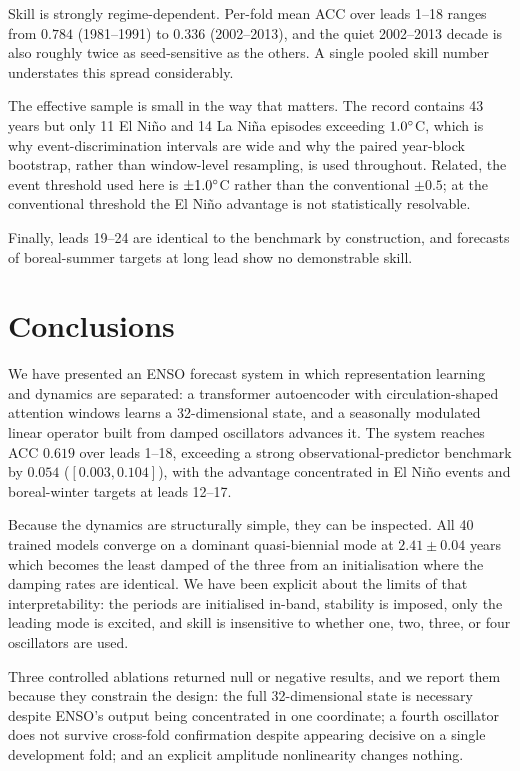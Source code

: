 Skill is strongly regime-dependent. Per-fold mean ACC over leads 1--18 ranges from $0.784$
(1981--1991) to $0.336$ (2002--2013), and the quiet 2002--2013 decade is also roughly twice as
seed-sensitive as the others. A single pooled skill number understates this spread
considerably.

The effective sample is small in the way that matters. The record contains 43 years but only 11
El Ni\~no and 14 La Ni\~na episodes exceeding $1.0^{\circ}$C, which is why event-discrimination
intervals are wide and why the paired year-block bootstrap, rather than window-level
resampling, is used throughout. Related, the event threshold used here is $\pm1.0^{\circ}$C rather
than the conventional $\pm0.5$; at the conventional threshold the El Ni\~no advantage is not
statistically resolvable.

Finally, leads 19--24 are identical to the benchmark by construction, and forecasts of
boreal-summer targets at long lead show no demonstrable skill.

\section{Conclusions}
\label{sec:conclusions}

We have presented an ENSO forecast system in which representation learning and dynamics are
separated: a transformer autoencoder with circulation-shaped attention windows learns a
32-dimensional state, and a seasonally modulated linear operator built from damped oscillators
advances it. The system reaches ACC $0.619$ over leads 1--18, exceeding a strong
observational-predictor benchmark by $0.054$ ($[0.003, 0.104]$), with the advantage
concentrated in El Ni\~no events and boreal-winter targets at leads 12--17.

Because the dynamics are structurally simple, they can be inspected. All 40 trained models
converge on a dominant quasi-biennial mode at $2.41 \pm 0.04$ years which becomes the least
damped of the three from an initialisation where the damping rates are identical. We have been
explicit about the limits of that interpretability: the periods are initialised in-band,
stability is imposed, only the leading mode is excited, and skill is insensitive to whether
one, two, three, or four oscillators are used.

Three controlled ablations returned null or negative results, and we report them because they
constrain the design: the full 32-dimensional state is necessary despite ENSO's output being
concentrated in one coordinate; a fourth oscillator does not survive cross-fold confirmation
despite appearing decisive on a single development fold; and an explicit amplitude
nonlinearity changes nothing.

